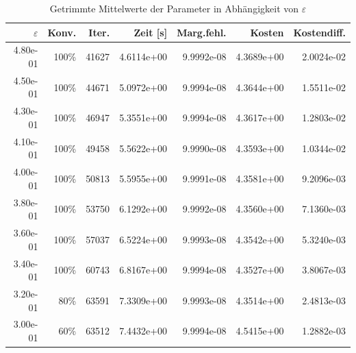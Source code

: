 \begin{table}[htbp]
\caption{Getrimmte Mittelwerte der Parameter in Abhängigkeit von $\varepsilon$}
\label{tab:Parametertest512_2}
\small
\centering
{}
\begin{tabular}{rrrrrrr}
\toprule
$\varepsilon$ & Konv. & Iter. & Zeit [s] & Marg.fehl. & Kosten & Kostendiff. \\
\midrule
4.80e-01 & 100\% & 41627 & 4.6114e+00 & 9.9992e-08 & 4.3689e+00 & 2.0024e-02 \\
4.50e-01 & 100\% & 44671 & 5.0972e+00 & 9.9994e-08 & 4.3644e+00 & 1.5511e-02 \\
4.30e-01 & 100\% & 46947 & 5.3551e+00 & 9.9994e-08 & 4.3617e+00 & 1.2803e-02 \\
4.10e-01 & 100\% & 49458 & 5.5622e+00 & 9.9990e-08 & 4.3593e+00 & 1.0344e-02 \\
4.00e-01 & 100\% & 50813 & 5.5955e+00 & 9.9991e-08 & 4.3581e+00 & 9.2096e-03 \\
3.80e-01 & 100\% & 53750 & 6.1292e+00 & 9.9992e-08 & 4.3560e+00 & 7.1360e-03 \\
3.60e-01 & 100\% & 57037 & 6.5224e+00 & 9.9993e-08 & 4.3542e+00 & 5.3240e-03 \\
3.40e-01 & 100\% & 60743 & 6.8167e+00 & 9.9994e-08 & 4.3527e+00 & 3.8067e-03 \\
3.20e-01 & 80\% & 63591 & 7.3309e+00 & 9.9993e-08 & 4.3514e+00 & 2.4813e-03 \\
3.00e-01 & 60\% & 63512 & 7.4432e+00 & 9.9994e-08 & 4.5415e+00 & 1.2882e-03 \\
\bottomrule
\end{tabular}
\end{table}

